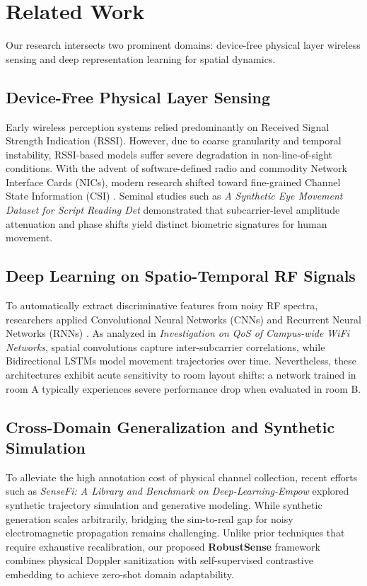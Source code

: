 \section{Related Work}
\label{sec:related_work}
Our research intersects two prominent domains: device-free physical layer wireless sensing and deep representation learning for spatial dynamics.

\subsection{Device-Free Physical Layer Sensing}
Early wireless perception systems relied predominantly on Received Signal Strength Indication (RSSI). However, due to coarse granularity and temporal instability, RSSI-based models suffer severe degradation in non-line-of-sight conditions. With the advent of software-defined radio and commodity Network Interface Cards (NICs), modern research shifted toward fine-grained Channel State Information (CSI) \cite{halperin2011tool, yang2022sensefi}. Seminal studies such as \textit{A Synthetic Eye Movement Dataset for Script Reading Det} demonstrated that subcarrier-level amplitude attenuation and phase shifts yield distinct biometric signatures for human movement.

\subsection{Deep Learning on Spatio-Temporal RF Signals}
To automatically extract discriminative features from noisy RF spectra, researchers applied Convolutional Neural Networks (CNNs) and Recurrent Neural Networks (RNNs) \cite{yang2022sensefi}. As analyzed in \textit{Investigation on QoS of Campus-wide WiFi Networks}, spatial convolutions capture inter-subcarrier correlations, while Bidirectional LSTMs model movement trajectories over time. Nevertheless, these architectures exhibit acute sensitivity to room layout shifts: a network trained in room A typically experiences severe performance drop when evaluated in room B.

\subsection{Cross-Domain Generalization and Synthetic Simulation}
To alleviate the high annotation cost of physical channel collection, recent efforts such as \textit{SenseFi: A Library and Benchmark on Deep-Learning-Empow} explored synthetic trajectory simulation and generative modeling. While synthetic generation scales arbitrarily, bridging the sim-to-real gap for noisy electromagnetic propagation remains challenging. Unlike prior techniques that require exhaustive recalibration, our proposed \textbf{RobustSense} framework combines physical Doppler sanitization with self-supervised contrastive embedding to achieve zero-shot domain adaptability.

